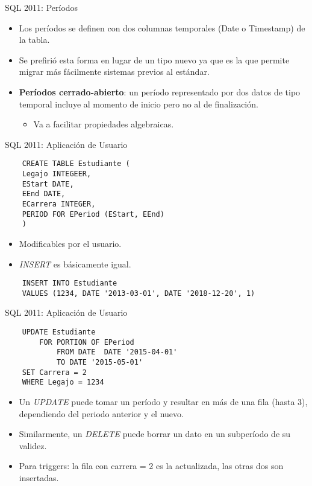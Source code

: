 \documentclass[handout, t, aspectratio=169]{beamer}
\begin{document}
\begin{frame}{SQL 2011: Períodos}
    \begin{itemize}
        \item Los períodos se definen con dos columnas temporales (Date o Timestamp) de la tabla. \pause
        \item Se prefirió esta forma en lugar de un tipo nuevo ya que es la que permite migrar más fácilmente sistemas previos al estándar.\pause
        \item \textbf{Períodos cerrado-abierto}: un período representado por dos datos de tipo temporal incluye al momento de inicio pero no al de finalización. \pause
        \begin{itemize}
            \item Va a facilitar propiedades algebraicas. 
        \end{itemize}
    \end{itemize}
\end{frame}

\begin{frame}[fragile]{SQL 2011: Aplicación de Usuario}
    \begin{verbatim}
    CREATE TABLE Estudiante (
    Legajo INTEGEER,
    EStart DATE,
    EEnd DATE,
    ECarrera INTEGER,
    PERIOD FOR EPeriod (EStart, EEnd)
    )
    \end{verbatim}\pause
    \begin{itemize}
        \item Modificables por el usuario.\pause
        \item \textit{INSERT} es básicamente igual.\pause
    \end{itemize}
    \begin{verbatim}
    INSERT INTO Estudiante
    VALUES (1234, DATE '2013-03-01', DATE '2018-12-20', 1)
    \end{verbatim}
\end{frame}

\begin{frame}[fragile]{SQL 2011: Aplicación de Usuario}
    \begin{verbatim}
    UPDATE Estudiante
        FOR PORTION OF EPeriod
            FROM DATE  DATE '2015-04-01'
            TO DATE '2015-05-01'
    SET Carrera = 2
    WHERE Legajo = 1234
    \end{verbatim}
    \pause
    \begin{itemize}
        \item Un \textit{UPDATE} puede tomar un período y resultar en más de una fila (hasta 3), dependiendo del periodo anterior y el nuevo.\pause
        \item Similarmente, un \textit{DELETE} puede borrar un dato en un subperíodo de su validez.\pause
        \item Para triggers: la fila con carrera = 2 es la actualizada, las otras dos son insertadas.
    \end{itemize}
\end{frame}
\end{document}
